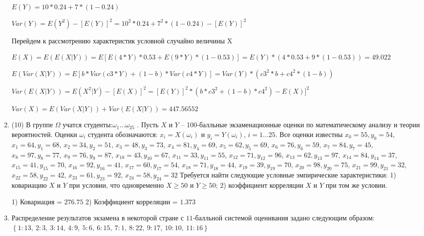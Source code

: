 \documentclass[a4paper,12pt]{article}
\begin{document}
\begin{enumerate}
	$E(Y) = 10 * 0.24 + 7 * (1 - 0.24)$

	$Var(Y) = E(Y^2) - [E(Y)]^2 = 10^2 * 0.24 + 7^2 * (1 - 0.24) - [E(Y)]^2$


	Перейдем к рассмотрению характеристик условной случайно величины X

	$E(X) = E(E(X|Y)) = E[E(4 * Y) * 0.53 + E(9 * Y) * (1 - 0.53)] = E(Y) * (4 * 0.53 + 9 * (1 - 0.53)) = 49.022$

	$E(Var(X|Y)) = E[b * Var(c3 * Y) + (1 - b) * Var(c4 * Y)] = Var(Y) * (c3^2 * b + c4^2 * (1- b)) $

	$Var(E(X|Y)) = E(X^2|Y) - [E(X)]^2 = [E(Y)]^2 * (b * c3^2 + (1-b)*c4^2) - E(X)]^2$

	$Var(X) = E(Var(X|Y)) + Var(E(X|Y)) = 447.56552$
	

\item


(10) В группе $\Omega$ учатся студенты:$\omega _{1}...\omega _{25}$ . Пусть $X$ и $Y$ – 100-балльные экзаменационные оценки по
математическому анализу и теории вероятностей. Оценки $\omega _{i}$ студента обозначаются: $x _{i} = X(\omega _{i})$ и $y _{i} = Y(\omega _{i})$, $i = 1...25$. Все оценки известны
$x _{0} = 55, y _{0} = 54$, $x _{1} = 64, y _{1} = 68$, $x _{2} = 34, y _{2} = 51$, $x _{3} = 48, y _{3} = 73$, $x _{4} = 81, y _{4} = 69$, $x _{5} = 62, y _{5} = 69$, $x _{6} = 76, y _{6} = 59$, $x _{7} = 84, y _{7} = 45$, $x _{8} = 97, y _{8} = 77$, $x _{9} = 76, y _{9} = 87$, $x _{10} = 43, y _{10} = 67$, $x _{11} = 33, y _{11} = 55$, $x _{12} = 71, y _{12} = 96$, $x _{13} = 62, y _{13} = 97$, $x _{14} = 84, y _{14} = 37$, $x _{15} = 41, y _{15} = 70$, $x _{16} = 92, y _{16} = 41$, $x _{17} = 60, y _{17} = 54$, $x _{18} = 71, y _{18} = 44$, $x _{19} = 39, y _{19} = 70$, $x _{20} = 98, y _{20} = 75$, $x _{21} = 99, y _{21} = 32$, $x _{22} = 58, y _{22} = 42$, $x _{23} = 61, y _{23} = 92$, $x _{24} = 58, y _{24} = 32$
Требуется
найти следующие условные эмпирические характеристики: 1) ковариацию $X$ и $Y$ при условии, что одновременно $X \geqslant 50$
 и $Y \geqslant 50$; 2) коэффициент корреляции $X$ и $Y$ при том же условии.




1) Ковариация = $276.75$
2) Коэффициент корреляции = $1.373$


\item

    
    	Распределение результатов экзамена в некоторой стране с $11$-балльной системой оценивания задано следующим образом:
    	$\left\{ 1 : 13, \  2 : 3, \  3 : 14, \  4 : 9, \  5 : 6, \  6 : 15, \  7 : 1, \  8 : 22, \  9 : 17, \  10 : 10, \  11 : 16\right\}$


\end{enumerate}
\end{document}

